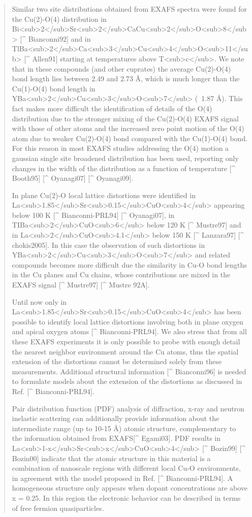 \begin{quote}
Similar two site distributions obtained from EXAFS spectra were found for the Cu(2)-O(4) distribution in Bi<sub>2</sub>Sr<sub>2</sub>CaCu<sub>2</sub>O<sub>8</sub> [^ Bianconni92] and in TlBa<sub>2</sub>Ca<sub>3</sub>Cu<sub>4</sub>O<sub>11</sub> [^ Allen91] starting at temperatures above T<sub>c</sub>. We note that in these compounds (and other cuprates) the average Cu(2)-O(4) bond length lies between 2.49 and 2.73 Å, which is much longer than the Cu(1)-O(4) bond length in YBa<sub>2</sub>Cu<sub>3</sub>O<sub>7</sub>  (~1.87 Å). This fact makes more difficult the identification of details of the O(4) distribution due to the stronger mixing of the Cu(2)-O(4) EXAFS signal with those of other atoms and the increased zero point motion of the O(4) atom due to weaker Cu(2)-O(4) bond compared with the Cu(1)-O(4) bond. For this reason in most EXAFS studies addressing the O(4) motion a gaussian single site broadened distribution has been used, reporting only changes in the width of the distribution as a function of temperature [^ Booth95] [^ Oyanagi07] [^ Oyanagi09].

In plane  Cu(2)-O local lattice distortions were identified in La<sub>1.85</sub>Sr<sub>0.15</sub>CuO<sub>4</sub> appearing below 100 K [^ Bianconni-PRL94] [^ Oyanagi07],  in TIBa<sub>2</sub>CuO<sub>6</sub> below 120 K  [^ Mustre97]  and in La<sub>2</sub>CuO<sub>4.1</sub> below 150 K [^ Lanzara97] [^ chokis2005]. In this case the observation of such distortions in YBa<sub>2</sub>Cu<sub>3</sub>O<sub>7</sub> and related compounds becomes more difficult due the similarity  in Cu-O bond lengths in the Cu planes and Cu chains, whose contributions are mixed in the EXAFS signal [^ Mustre97] [^ Mustre 92A].

Until now only in La<sub>1.85</sub>Sr<sub>0.15</sub>CuO<sub>4</sub> has been possible to identify local lattice distortions involving both in plane oxygen and apical oxygen atoms [^ Bianconni-PRL94]. We also stress that from all these EXAFS experiments it is only possible to probe with enough detail the nearest neighbor environment around the Cu atoms, thus the spatial extension of the distortions cannot be determined solely from these measurements. Additional structural information [^ Bianconni96] is needed to formulate models about the extension of the distortions as discussed in Ref. [^ Bianconni-PRL94].

Pair distribution function (PDF) analysis of diffraction, x-ray and neutron inelastic scattering can additionally provide information about the intermediate range (up to 10-15 Å)  atomic structure, complementary to the information obtained from EXAFS[^ Egami03]. PDF results in La<sub>1-x</sub>Sr<sub>x</sub>CuO<sub>4</sub> [^ Bozin99] [^ Bozin00] indicate that the atomic structure in this material is a combination of nanoscale regions with different local Cu-O environments, in agreement with the model proposed in Ref. [^ Bianconni-PRL94]. A homogeneous structure only appears when dopant concentrations are above x = 0.25. In this region the electronic behavior can be described in terms of free fermion quasiparticles.


\end{quote}
